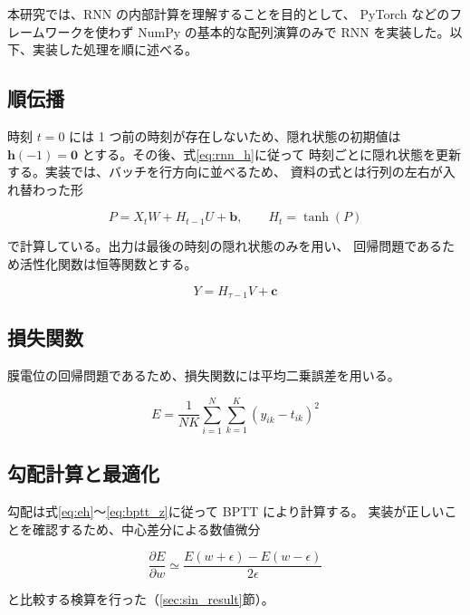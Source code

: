 \documentclass[a4paper,11pt,openany]{ltjsreport}
\begin{document}
本研究では、RNN の内部計算を理解することを目的として、
PyTorch などのフレームワークを使わず NumPy の基本的な配列演算のみで
RNN を実装した。以下、実装した処理を順に述べる。

\subsection{順伝播}

時刻 $t = 0$ には 1 つ前の時刻が存在しないため、隠れ状態の初期値は
$\bm{h}(-1) = \bm{0}$ とする。その後、式\eqref{eq:rnn_h}に従って
時刻ごとに隠れ状態を更新する。実装では、バッチを行方向に並べるため、
資料の式とは行列の左右が入れ替わった形

\begin{equation}
  P = X_t W + H_{t-1} U + \bm{b}, \qquad H_t = \tanh(P)
  \label{eq:forward_impl}
\end{equation}

で計算している。出力は最後の時刻の隠れ状態のみを用い、
回帰問題であるため活性化関数は恒等関数とする。

\begin{equation}
  Y = H_{\tau-1} V + \bm{c}
  \label{eq:out_impl}
\end{equation}

\subsection{損失関数}

膜電位の回帰問題であるため、損失関数には平均二乗誤差を用いる。

\begin{equation}
  E = \frac{1}{NK} \sum_{i=1}^{N} \sum_{k=1}^{K} \left( y_{ik} - t_{ik} \right)^2
  \label{eq:mse}
\end{equation}

\subsection{勾配計算と最適化}

勾配は式\eqref{eq:eh}〜\eqref{eq:bptt_z}に従って BPTT により計算する。
実装が正しいことを確認するため、中心差分による数値微分

\begin{equation}
  \frac{\partial E}{\partial w} \simeq \frac{E(w + \epsilon) - E(w - \epsilon)}{2\epsilon}
  \label{eq:numgrad}
\end{equation}

と比較する検算を行った（\ref{sec:sin_result}節）。
\end{document}
